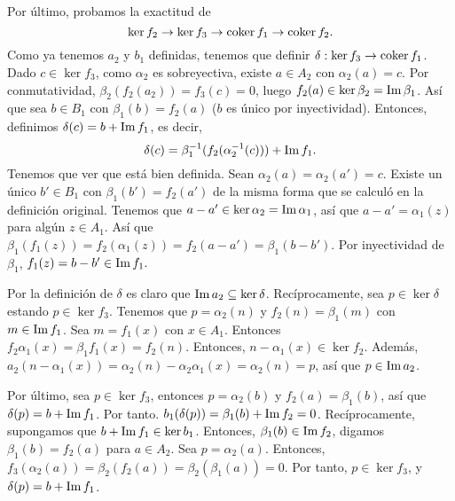\documentclass[twoside]{article}
\begin{document}
\begin{solucion}
Por último, probamos la exactitud de 
\[
\ker{f_2}\to \ker{f_3}\to \operatorname{coker}{f_1}\to \operatorname{coker}{f_2}.
\]
Como ya tenemos $a_2$ y $b_1$ definidas, tenemos que definir $\delta:\ker{f_3}\to\operatorname{coker}{f_1}$. Dado $c\in\ker{f_3}$, como $\alpha_2$ es sobreyectiva, existe $a\in A_2$ con $\alpha_2(a)=c$. Por conmutatividad, $\beta_2(f_2(a_2))=f_3(c)=0$, luego $f_2(a)\in\ker{\beta_2}=\operatorname{Im}{\beta_1}$. Así que sea $b\in B_1$ con $\beta_1(b)=f_2(a)$ ($b$ es único por inyectividad). Entonces, definimos $\delta(c)=b+\operatorname{Im}{f_1}$, es decir, $$\delta(c)=\beta_1^{-1}(f_2(\alpha_2^{-1}(c)))+\operatorname{Im}{f_1}.$$ Tenemos que ver que está bien definida. Sean $\alpha_2(a)=\alpha_2(a')=c$. Existe un único $b'\in B_1$ con $\beta_1(b')=f_2(a')$ de la misma forma que se calculó en la definición original. Tenemos que $a-a'\in\ker{\alpha_2}=\operatorname{Im}{\alpha_1}$, así que $a-a'=\alpha_1(z)$ para algún $z\in A_1$. Así que $\beta_1(f_1(z))=f_2(\alpha_1(z))=f_2(a-a')=\beta_1(b-b')$. Por inyectividad de $\beta_1$, $f_1(z)=b-b'\in\operatorname{Im}{f_1}.$

Por la definición de $\delta$ es claro que $\operatorname{Im}{a_2}\subseteq\ker{\delta}$. Recíprocamente, sea $p\in\ker{\delta}$ estando $p\in\ker{f_3}$. Tenemos que $p=\alpha_2(n)$ y $f_2(n)=\beta_1(m)$ con $m\in\operatorname{Im}{f_1}$. Sea $m=f_1(x)$ con $x\in A_1$. Entonces $f_2\alpha_1(x)=\beta_1 f_1(x)=f_2(n)$.  Entonces, $n-\alpha_1(x)\in\ker{f_2}$. Además, $a_2(n-\alpha_1(x))=\alpha_2(n)-\alpha_2\alpha_1(x)=\alpha_2(n)=p$, así que $p\in\operatorname{Im}{a_2}$.

Por último, sea $p\in\ker{f_3}$, entonces $p=\alpha_2(b)$ y $f_2(a)=\beta_1(b)$, así que $\delta(p)=b+\operatorname{Im}{f_1}$. Por tanto. $b_1(\delta(p))=\beta_1(b)+\operatorname{Im}{f_2}=0$. Recíprocamente, supongamos que $b+\operatorname{Im}{f_1}\in\ker{b_1}$. Entonces, $\beta_1(b)\in\operatorname{Im}{f_2}$, digamos $\beta_1(b)=f_2(a)$ para $a\in A_2$. Sea $p=\alpha_2(a)$. Entonces, $f_3(\alpha_2(a))=\beta_2(f_2(a))=\beta_2(\beta_1(a))=0$. Por tanto, $p\in\ker{f_3}$, y $\delta(p)=b+\operatorname{Im}{f_1}$.
\end{solucion}
\newpage
\end{document}
